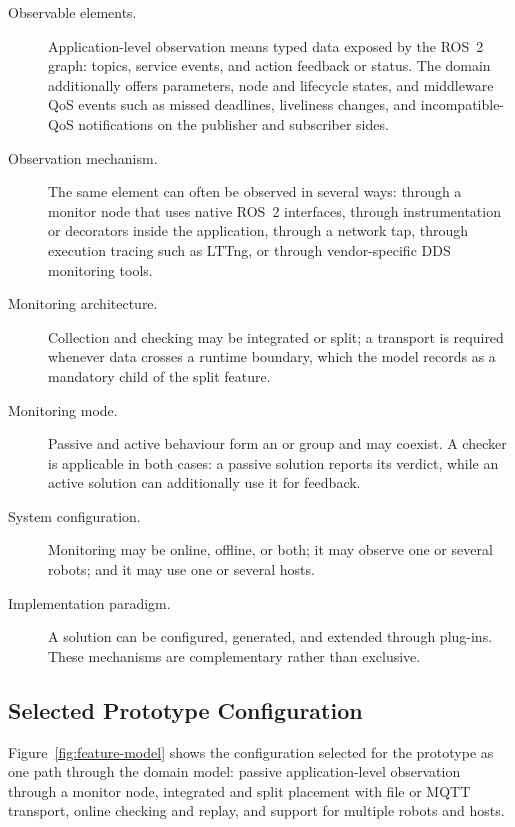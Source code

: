 \begin{description}
  \item[Observable elements.] Application-level observation means typed data
  exposed by the ROS~2 graph: topics, service events, and action feedback or
  status. The domain additionally offers parameters, node and lifecycle
  states, and middleware QoS events such as missed deadlines, liveliness
  changes, and incompatible-QoS notifications on the publisher and subscriber
  sides.

  \item[Observation mechanism.] The same element can often be observed in
  several ways: through a monitor node that uses native ROS~2 interfaces,
  through instrumentation or decorators inside the application, through a
  network tap, through execution tracing such as LTTng, or through
  vendor-specific DDS monitoring tools.

  \item[Monitoring architecture.] Collection and checking may be integrated or
  split; a transport is required whenever data crosses a runtime boundary,
  which the model records as a mandatory child of the split feature.

  \item[Monitoring mode.] Passive and active behaviour form an or group and
  may coexist. A checker is applicable in both cases: a passive
  solution reports its verdict, while an active solution can additionally use
  it for feedback.

  \item[System configuration.] Monitoring may be online, offline, or both; it
  may observe one or several robots; and it may use one or several hosts.

  \item[Implementation paradigm.] A solution can be configured, generated, and
  extended through plug-ins. These mechanisms are complementary rather than
  exclusive.
\end{description}

\subsection{Selected Prototype Configuration}

Figure~\ref{fig:feature-model} shows the configuration selected for the
prototype as one path through the domain model: passive application-level
observation through a monitor node, integrated and split placement with file
or MQTT transport, online checking and replay, and support for multiple
robots and hosts.


